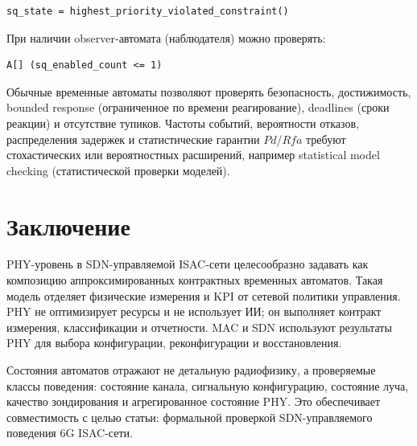 \documentclass[12pt,a4paper]{article}
\begin{document}
\begin{verbatim}
sq_state = highest_priority_violated_constraint()
\end{verbatim}

При наличии observer-автомата (наблюдателя) можно проверять:

\begin{verbatim}
A[] (sq_enabled_count <= 1)
\end{verbatim}

Обычные временные автоматы позволяют проверять безопасность, достижимость, bounded response (ограниченное по времени реагирование), deadlines (сроки реакции) и отсутствие тупиков. Частоты событий, вероятности отказов, распределения задержек и статистические гарантии \(Pd\)/\(Rfa\) требуют стохастических или вероятностных расширений, например statistical model checking (статистической проверки моделей).

\section{Заключение}

PHY-уровень в SDN-управляемой ISAC-сети целесообразно задавать как композицию аппроксимированных контрактных временных автоматов. Такая модель отделяет физические измерения и KPI от сетевой политики управления. PHY не оптимизирует ресурсы и не использует ИИ; он выполняет контракт измерения, классификации и отчетности. MAC и SDN используют результаты PHY для выбора конфигурации, реконфигурации и восстановления.

Состояния автоматов отражают не детальную радиофизику, а проверяемые классы поведения: состояние канала, сигнальную конфигурацию, состояние луча, качество зондирования и агрегированное состояние PHY. Это обеспечивает совместимость с целью статьи: формальной проверкой SDN-управляемого поведения 6G ISAC-сети.
\end{document}
